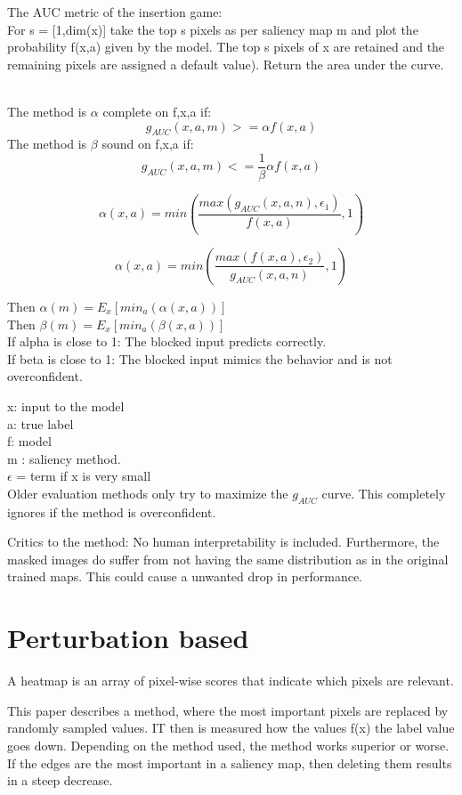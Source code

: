 The AUC metric \cite{petsiuk2018rise} of the insertion game:\\
For s = [1,dim(x)] take the top s pixels as per saliency map m and plot the probability f(x,a) given by the model. The top s pixels of x are retained and the  remaining pixels are assigned a default value). Return the area under the curve.\\\

The method is $\alpha$ complete on f,x,a if:
$$ g_{AUC} (x,a,m) >= \alpha f(x,a)$$
The method is $\beta$ sound on f,x,a if:
$$ g_{AUC} (x,a,m) <= \frac{1}{\beta}\alpha f(x,a)$$

$$\alpha(x,a) = min(\frac{max(g_{AUC}(x,a,n),\epsilon_1)}{f(x,a)},1)$$

$$\alpha(x,a)=min(\frac{max(f(x,a),\epsilon_2)}{g_{AUC}(x,a,n)},1)$$

Then $\alpha(m) = E_x[min_a(\alpha(x,a))]$\\
Then $\beta(m) = E_x[min_a(\beta(x,a))]$\\

If alpha is close to 1: The blocked input predicts correctly. \\ If beta is close to 1: The blocked input mimics the behavior and is not overconfident.

x: input to the model \\
a: true label \\
f: model\\
m : saliency method.\\
$\epsilon$ = term if x is very small\\

Older evaluation methods only try to maximize the $g_{AUC}$ curve. This completely ignores if the method is overconfident.


Critics to the method: No human interpretability is included. Furthermore, the masked images do suffer from not having the same distribution as in the original trained maps. This could cause a unwanted drop in performance.

\section{Perturbation based \cite{7552539}}
\label{pertubation}

A heatmap is an array of pixel-wise scores that indicate which pixels are relevant.

This paper describes a method, where the most important pixels are replaced by randomly sampled values. IT then is measured how the values f(x) the label value goes down. Depending on the method used, the method works superior or worse. If the edges are the most important in a saliency map, then deleting them results in a steep decrease.


